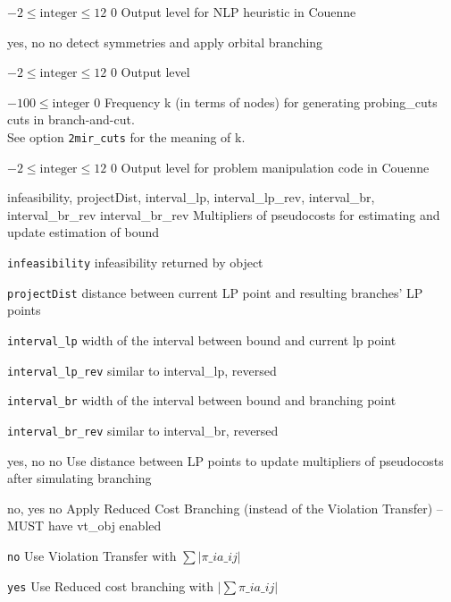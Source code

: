 %
{$-2\leq\textrm{integer}\leq12$}%
{$0$}%
{Output level for NLP heuristic in Couenne}%
{}

%
{\ttfamily yes, no}%
{no}%
{detect symmetries and apply orbital branching}%
{}

%
{$-2\leq\textrm{integer}\leq12$}%
{$0$}%
{Output level}%
{}

%
{$-100\leq\textrm{integer}$}%
{$0$}%
{Frequency k (in terms of nodes) for generating probing\_cuts cuts in branch-and-cut.\\
See option \texttt{2mir\_cuts} for the meaning of k.}%
{}

%
{$-2\leq\textrm{integer}\leq12$}%
{$0$}%
{Output level for problem manipulation code in Couenne}%
{}

%
{\ttfamily infeasibility, projectDist, interval\_lp, interval\_lp\_rev, interval\_br, interval\_br\_rev}%
{interval\_br\_rev}%
{Multipliers of pseudocosts for estimating and update estimation of bound}%
{\begin{list}{}{
\setlength{\parsep}{0em}
\setlength{\leftmargin}{5ex}
\setlength{\labelwidth}{2ex}
\setlength{\itemindent}{0ex}
\setlength{\topsep}{0pt}}
\item[\texttt{infeasibility}] infeasibility returned by object
\item[\texttt{projectDist}] distance between current LP point and resulting branches' LP points
\item[\texttt{interval\_lp}] width of the interval between bound and current lp point
\item[\texttt{interval\_lp\_rev}] similar to interval\_lp, reversed
\item[\texttt{interval\_br}] width of the interval between bound and branching point
\item[\texttt{interval\_br\_rev}] similar to interval\_br, reversed
\end{list}
}

%
{\ttfamily yes, no}%
{no}%
{Use distance between LP points to update multipliers of pseudocosts after simulating branching}%
{}

%
{\ttfamily no, yes}%
{no}%
{Apply Reduced Cost Branching (instead of the Violation Transfer) -- MUST have vt\_obj enabled}%
{\begin{list}{}{
\setlength{\parsep}{0em}
\setlength{\leftmargin}{5ex}
\setlength{\labelwidth}{2ex}
\setlength{\itemindent}{0ex}
\setlength{\topsep}{0pt}}
\item[\texttt{no}] Use Violation Transfer with $\sum |\pi\_i a\_{ij}|$
\item[\texttt{yes}] Use Reduced cost branching with $|\sum \pi\_i a\_{ij}|$
\end{list}
}


